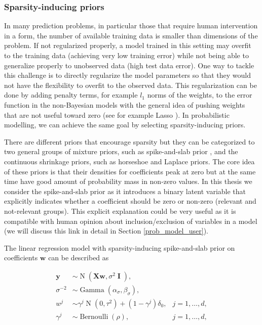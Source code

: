 \documentclass[dissertation,math,vertlayout,pdfa,colorlinks]{aaltoseries}
\newcommand{\bw}{\bm{w}}
\newcommand{\bX}{\bm{X}}
\newcommand{\by}{\bm{y}}
\DeclareMathOperator{\eye}{\textbf{I}}
\DeclareMathOperator{\bernoullipdf}{Bernoulli}
\DeclareMathOperator{\normalpdf}{N}
\DeclareMathOperator{\gammapdf}{Gamma}
\begin{document}
\subsubsection{Sparsity-inducing priors}

In many prediction problems, in particular those that require human intervention in a form, the number of available training data is smaller than dimensions of the problem. If not regularized properly, a model trained in this setting may overfit to the training data (achieving very low training error) while not being able to generalize properly to unobserved data (high test data error). One way to tackle this challenge is to directly regularize the model parameters so that they would not have the flexibility to overfit to the observed data. This regularization can be done by adding penalty terms, for example $l_1$ norms of the weights, to the error function in the non-Bayesian models with the general idea of pushing weights that are not useful toward zero (see for example Lasso \cite{lasso2011}). In probabilistic modelling, we can achieve the same goal by selecting sparsity-inducing priors. 

There are different priors that encourage sparsity but they can be categorized to two general groups of mixture priors, such as spike-and-slab prior \cite{spike_slab1993}, and the continuous shrinkage priors, such as horseshoe \cite{horseshoe_2017} and Laplace \cite{seeger2008bayesian} priors. The core idea of these priors is that their densities for coefficients peak at zero but at the same time have good amount of probability mass in non-zero values. In this thesis we consider the spike-and-slab prior as it introduces a binary latent variable that explicitly indicates whether a coefficient should be zero or non-zero  (relevant and not-relevant groups). This explicit explanation could be very useful as it is compatible with human opinion about inclusion/exclusion of variables in a model (we will discuss this link in detail in Section \ref{prob_model_user}).

The linear regression model with sparsity-inducing spike-and-slab prior on coefficients $\bw$ can be described as

\begin{align}\label{Eq:ss_Bayesian_regression}
\by &\sim \normalpdf(\bX\bw,\sigma^2 \eye), \\
\sigma^{-2} &\sim \gammapdf(\alpha_{\sigma}, \beta_{\sigma}), \nonumber \\
w^j &\sim \gamma^j \normalpdf(0, \tau^2) + (1 - \gamma^j) \delta_0,  & j=1,\ldots,d, \nonumber\\
\gamma^j &\sim \bernoullipdf(\rho), & j=1,\ldots,d, \nonumber
\end{align}
\end{document}
